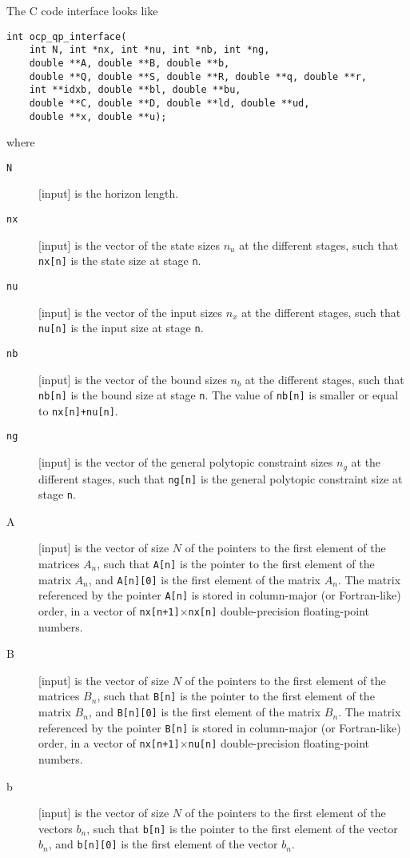 \documentclass{report}
\begin{document}
The C code interface looks like
\begin{verbatim}
int ocp_qp_interface(
    int N, int *nx, int *nu, int *nb, int *ng, 
    double **A, double **B, double **b, 
    double **Q, double **S, double **R, double **q, double **r, 
    int **idxb, double **bl, double **bu, 
    double **C, double **D, double **ld, double **ud, 
    double **x, double **u);
\end{verbatim}
where
\begin{description}
\item[{\tt N}] [input] is the horizon length.
\item[{\tt nx}] [input] is the vector of the state sizes $n_u$ at the different stages, such that {\tt nx[n]} is the state size at stage {\tt n}.
\item[{\tt nu}] [input] is the vector of the input sizes $n_x$ at the different stages, such that {\tt nu[n]} is the input size at stage {\tt n}.
\item[{\tt nb}] [input] is the vector of the bound sizes $n_b$ at the different stages, such that {\tt nb[n]} is the bound size at stage {\tt n}.
The value of {\tt nb[n]} is smaller or equal to {\tt nx[n]+nu[n]}.
\item[{\tt ng}] [input] is the vector of the general polytopic constraint sizes $n_g$ at the different stages, such that {\tt ng[n]} is the general polytopic constraint size at stage {\tt n}.
\item[A] [input] is the vector of size $N$ of the pointers to the first element of the matrices $A_n$, such that {\tt A[n]} is the pointer to the first element of the matrix $A_n$, and {\tt A[n][0]} is the first element of the matrix $A_n$.
The matrix referenced by the pointer {\tt A[n]} is stored in column-major (or Fortran-like) order, in a vector of {\tt nx[n+1]$\times$nx[n]} double-precision floating-point numbers.
\item[B] [input] is the vector of size $N$ of the pointers to the first element of the matrices $B_n$, such that {\tt B[n]} is the pointer to the first element of the matrix $B_n$, and {\tt B[n][0]} is the first element of the matrix $B_n$.
The matrix referenced by the pointer {\tt B[n]} is stored in column-major (or Fortran-like) order, in a vector of {\tt nx[n+1]$\times$nu[n]} double-precision floating-point numbers.
\item[b] [input] is the vector of size $N$ of the pointers to the first element of the vectors $b_n$, such that {\tt b[n]} is the pointer to the first element of the vector $b_n$, and {\tt b[n][0]} is the first element of the vector $b_n$.

\end{description}
\end{document}
